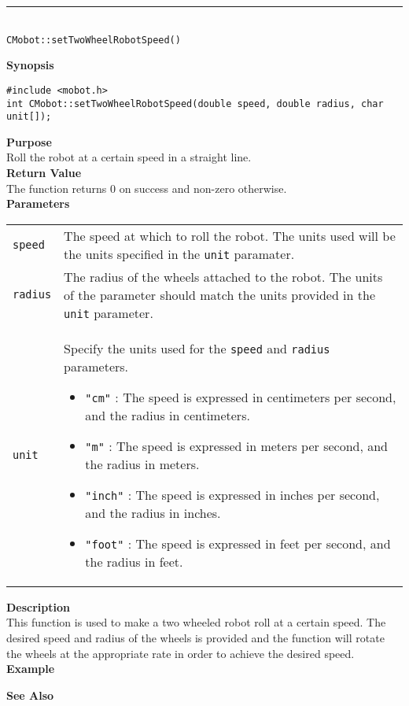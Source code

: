\noindent
\vspace{5pt}
\rule{4.5in}{0.015in}\\
\noindent
{\LARGE \texttt{CMobot::setTwoWheelRobotSpeed()}}\\
{}

\noindent
{\bf Synopsis}\\
\begin{verbatim}
#include <mobot.h>
int CMobot::setTwoWheelRobotSpeed(double speed, double radius, char unit[]);
\end{verbatim}

\noindent
{\bf Purpose}\\
Roll the robot at a certain speed in a straight line.\\

\noindent
{\bf Return Value}\\
The function returns 0 on success and non-zero otherwise.\\

\noindent
{\bf Parameters}
\vspace{-0.1in}
\begin{description}
\item               
\begin{tabular}{p{10 mm}p{145 mm}}
\texttt{speed} & The speed at which to roll the robot. The units used will be the units
specified in the \texttt{unit} paramater. \\
\texttt{radius} & The radius of the wheels attached to the robot. The units of the parameter
should match the units provided in the \texttt{unit} parameter. \\
\texttt{unit} & Specify the units used for the \texttt{speed} and \texttt{radius} parameters.
\begin{itemize}
\item \texttt{"cm"} : The speed is expressed in centimeters per second, and the radius in centimeters.
\item \texttt{"m"} : The speed is expressed in meters per second, and the radius in meters.
\item \texttt{"inch"} : The speed is expressed in inches per second, and the radius in inches.
\item \texttt{"foot"} : The speed is expressed in feet per second, and the radius in feet.
\end{itemize}
\end{tabular}
\end{description}

\noindent
{\bf Description}\\
This function is used to make a two wheeled robot roll at a certain speed. The desired 
speed and radius of the wheels is provided and the function will rotate the wheels at the
appropriate rate in order to achieve the desired speed.
\noindent\\
{\bf Example}\\
\noindent

\noindent
{\bf See Also}\\

